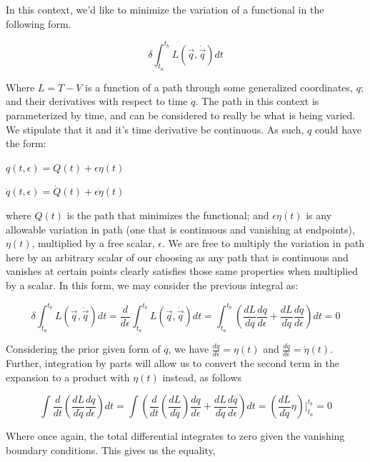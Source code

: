 \documentclass{article}\usepackage[]{graphicx}\usepackage[]{color}
\begin{document}
In this context, we'd like to minimize the variation of a functional in the following form.

\begin{equation}
\delta\int^{t_b}_{t_a}L(\vec{q},\dot{\vec{q}})dt
\end{equation}

Where $L=T-V$ is a function of a path through some generalized coordinates, $q$; and their derivatives with respect to time $\dot{q}$. The path in this context is parameterized by time, and can be considered to really be what is being varied. We stipulate that it and it's time derivative be continuous. As such, $q$ could have the form:

\begin{center}
$q(t,\epsilon)=Q(t)+\epsilon\eta(t)$

$\dot{q}(t,\epsilon)=\dot{Q}(t)+\epsilon\dot{\eta}(t)$
\end{center}

where $Q(t)$ is the path that minimizes the functional; and $\epsilon\eta(t)$ is any allowable variation in path (one that is continuous and vanishing at endpoints),$\eta(t)$, multiplied by a free scalar, $\epsilon$. We are free to multiply the variation in path here by an arbitrary scalar of our choosing as any path that is continuous and vanishes at certain points clearly satisfies those same properties when multiplied by a scalar. In this form, we may consider the previous integral as:

\begin{equation}
\delta\int^{t_b}_{t_a}L(\vec{q},\dot{\vec{q}})dt=\frac{d}{d\epsilon}\int^{t_b}_{t_a}L(\vec{q},\dot{\vec{q}})dt=\int^{t_b}_{t_a}\left( \frac{dL}{dq}\frac{dq}{d\epsilon}+\frac{dL}{d\dot{q}}\frac{d\dot{q}}{d\epsilon}\right) dt=0
\end{equation}

Considering the prior given form of $q$, we have $\frac{dq}{d\epsilon}=\eta(t)$ and $\frac{d\dot{q}}{d\epsilon}=\dot{\eta}(t)$. Further, integration by parts will allow us to convert the second term in the expansion to a product with $\eta(t)$ instead, as follows



$$\int\frac{d}{dt}\left( \frac{dL}{d\dot{q}}\frac{dq}{d\epsilon} \right) dt
=\int\left(\frac{d}{dt}\left(\frac{dL}{d\dot{q}}\right)\frac{dq}{d\epsilon}+\frac{dL}{d\dot{q}}\frac{d\dot{q}}{d\epsilon}\right)dt=\left( \frac{dL}{d\dot{q}}\eta \right) \vert^{t_b}_{t_a}=0
$$
 
Where once again, the total differential integrates to zero given the vanishing boundary conditions. This gives us the equality,
\end{document}
